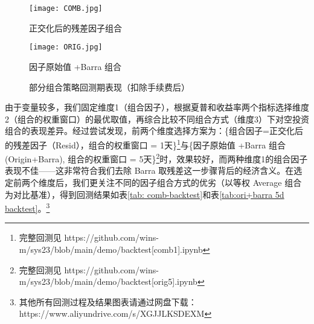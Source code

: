 \documentclass[11pt]{article}
\begin{document}
\begin{figure}[htbp]
	\begin{minipage}{0.5\linewidth}
		\centerline{\texttt{[image: COMB.jpg]}}
		\centerline{正交化后的残差因子组合}
	\end{minipage}
	\begin{minipage}{0.5\linewidth}
		\centerline{\texttt{[image: ORIG.jpg]}}	 
		\centerline{因子原始值 +Barra 组合}
	\end{minipage}
 
	\caption{部分组合策略回测期表现（扣除手续费后）}
	\label{fig:factor_combo}
\end{figure}


由于变量较多，我们固定维度1（组合因子），根据夏普和收益率两个指标选择维度2（组合的权重窗口）的最优取值，再综合比较不同组合方式（维度3）下对空投资组合的表现差异。经过尝试发现，前两个维度选择方案为：\{组合因子=正交化后的残差因子（Resid），组合的权重窗口 = 1天\}\footnote{完整回测见 https://github.com/wins-m/sys23/blob/main/demo/backtest[comb1].ipynb}与\{因子原始值 +Barra 组合(Origin+Barra), 组合的权重窗口 = 5天\}\footnote{完整回测见 https://github.com/wins-m/sys23/blob/main/demo/backtest[orig5].ipynb}时，效果较好，而两种维度1的组合因子表现不佳——这非常符合我们去除 Barra 取残差这一步骤背后的经济含义。在选定前两个维度后，我们更关注不同的因子组合方式的优劣（以等权 Average 组合为对比基准），得到回测结果如表\ref{tab: comb-backtest}和表\ref{tab:ori+barra 5d backtest}。\footnote{其他所有回测过程及结果图表请通过网盘下载：https://www.aliyundrive.com/s/XGJJLKSDEXM
}
\end{document}
